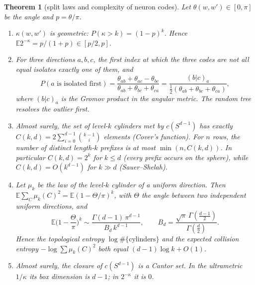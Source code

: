 \documentclass[11pt]{article}
\newtheorem{theorem}{Theorem}[section]
\theoremstyle{definition}
\theoremstyle{remark}
\newcommand{\E}{\mathbb E}
\begin{document}
\begin{theorem}[split laws and complexity of neuron codes]\label{thm:codes}
Let $\theta(w,w')\in[0,\pi]$ be the angle and $p=\theta/\pi$.
\begin{enumerate}
\item[(i)] $\kappa(w,w')$ is geometric: $P(\kappa>k)=(1-p)^k$. Hence $\E2^{-\kappa}=p/(1+p)\in[p/2,p]$.
\item[(ii)] For three directions $a,b,c$, the first index at which the three codes are not all equal isolates exactly one of them, and
\[P(\text{$a$ is isolated first})=\frac{\theta_{ab}+\theta_{ac}-\theta_{bc}}{\theta_{ab}+\theta_{bc}+\theta_{ca}}=\frac{(b|c)_a}{\tfrac12(\theta_{ab}+\theta_{bc}+\theta_{ca})},\]
where $(b|c)_a$ is the Gromov product in the angular metric. The random tree resolves the outlier first.
\item[(iii)] Almost surely, the set of level-$k$ cylinders met by $c(S^{d-1})$ has exactly $C(k,d)=2\sum_{i=0}^{d-1}\binom{k-1}{i}$ elements (Cover's function). For $n$ rows, the number of distinct length-$k$ prefixes is at most $\min(n,C(k,d))$. In particular $C(k,d)=2^k$ for $k\le d$ (every prefix occurs on the sphere), while $C(k,d)=O(k^{d-1})$ for $k\gg d$ (Sauer--Shelah).
\item[(iv)] Let $\mu_k$ be the law of the level-$k$ cylinder of a uniform direction. Then $\E\sum_{C}\mu_k(C)^2=\E(1-\Theta/\pi)^k$, with $\Theta$ the angle between two independent uniform directions, and
\[\E\Big(1-\frac\Theta\pi\Big)^k\sim\frac{\Gamma(d-1)\,\pi^{d-1}}{B_d\,k^{d-1}},\qquad B_d=\frac{\sqrt\pi\,\Gamma(\frac{d-1}2)}{\Gamma(\frac d2)}.\]
Hence the topological entropy $\log\#\{\text{cylinders}\}$ and the expected collision entropy $-\log\sum\mu_k(C)^2$ both equal $(d-1)\log k+O(1)$.
\item[(v)] Almost surely, the closure of $c(S^{d-1})$ is a Cantor set. In the ultrametric $1/\kappa$ its box dimension is $d-1$; in $2^{-\kappa}$ it is $0$.
\end{enumerate}
\end{theorem}
\end{document}

